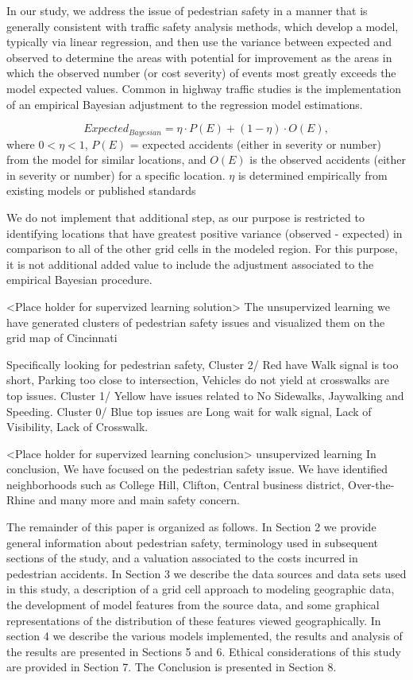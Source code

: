 \documentclass{llncs}
\begin{document}
In our study, we address the issue of pedestrian safety in a manner that is generally consistent with traffic safety analysis methods, which develop a model, typically via linear regression,  and then use the variance between expected and observed to determine the areas with potential for improvement as the areas in which the observed number (or cost severity) of events most greatly exceeds the model expected values. Common in highway traffic studies is the implementation of an empirical Bayesian adjustment to the regression model estimations.

\begin{equation} Expected_{Bayesian} = \eta \cdot P(E)  + (1 - \eta) \cdot O(E),
\end{equation} \newline
where $0 < \eta < 1$, $P(E)$ = expected accidents (either in severity or number) from the model for similar locations, and
$O(E)$ is the observed accidents (either in severity or number) for a specific location. $\eta$ is determined empirically from existing models or published standards\cite{kol2014highway}

We do not implement that additional step, as our purpose is restricted to identifying locations that have greatest positive variance (observed - expected) in comparison to all of the other grid cells in the modeled region. For this purpose, it is not additional added value to include the adjustment associated to the empirical Bayesian procedure.

<Place holder for supervized learning solution>
The unsupervized learning we have generated clusters of pedestrian safety issues and visualized them on the grid map of Cincinnati

Specifically looking for pedestrian safety, Cluster 2/ Red have Walk signal is too short, Parking too close to intersection, Vehicles do not yield at crosswalks are top issues. Cluster 1/ Yellow have issues related to No Sidewalks, Jaywalking and Speeding. Cluster 0/ Blue top issues are Long wait for walk signal, Lack of Visibility, Lack of	Crosswalk.

<Place holder for supervized learning conclusion>
unsupervized learning In conclusion, We have focused on the pedestrian safety issue. We have identified neighborhoods such as College Hill, Clifton, Central business district, Over-the-Rhine and many more and main safety concern.

The remainder of this paper is organized as follows. In Section 2 we provide general information about pedestrian safety, terminology used in subsequent sections of the study, and a valuation associated to the costs incurred in pedestrian accidents. In Section 3 we describe the data sources and data sets used in this study, a description of a grid cell approach to modeling geographic data, the development of model features from the source data, and some graphical representations of the distribution of these features viewed geographically. In section 4 we describe the various models implemented, the results and analysis of the results are presented in Sections 5 and 6. Ethical considerations of this study are provided in Section 7. The Conclusion is presented in Section 8. 
\end{document}
